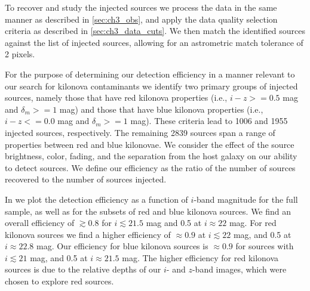 To recover and study the injected sources we process the data in the same manner as described in \cref{sec:ch3_obs}, and apply the data quality selection criteria as described in \cref{sec:ch3_data_cuts}. We then match the identified sources against the list of injected sources, allowing for an astrometric match tolerance of 2 pixels.

For the purpose of determining our detection efficiency in a manner relevant to our search for kilonova contaminants we identify two primary groups of injected sources, namely those that have red kilonova properties (i.e., $i-z>=0.5$ mag and $\delta_m>=1$ mag) and those that have blue kilonova properties (i.e., $i-z<=0.0$ mag and $\delta_m>=1$ mag). These criteria lead to 1006 and 1955 injected sources, respectively. The remaining 2839 sources span a range of properties between red and blue kilonovae. We consider the effect of the source brightness, color, fading, and the separation from the host galaxy on our ability to detect sources. We define our efficiency as the ratio of the number of sources recovered to the number of sources injected.

In  we plot the detection efficiency as a function of $i$-band magnitude for the full sample, as well as for the subsets of red and blue kilonova sources. We find an overall efficiency of $\gtrsim0.8$ for $i \lesssim 21.5$ mag and 0.5 at $i \approx 22$ mag. For red kilonova sources we find a higher efficiency of $\approx 0.9$ at $i\lesssim 22$ mag, and 0.5 at $i\approx 22.8$ mag. Our efficiency for blue kilonova sources is $\approx 0.9$ for sources with $i\lesssim 21$ mag, and 0.5 at $i\approx 21.5$ mag. The higher efficiency for red kilonova sources is due to the relative depths of our $i$- and $z$-band images, which were chosen to explore red sources.

